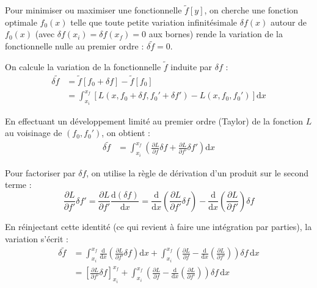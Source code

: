 \documentclass[french]{yLectureNote}
\newcommand{\dd}{\mathrm{d}}
\begin{document}

Pour minimiser ou maximiser une fonctionnelle $\tilde{f}[y]$, on cherche une fonction optimale $f_0(x)$ telle que toute petite variation infinitésimale $\delta f(x)$ autour de $f_0(x)$ (avec $\delta f(x_i) = \delta f(x_f) = 0$ aux bornes) rende la variation de la fonctionnelle nulle au premier ordre : $\delta \tilde{f} = 0$.

On calcule la variation de la fonctionnelle $\tilde{f}$ induite par $\delta f$ :
\begin{align*}
    \delta \tilde{f} &= \tilde{f}[f_0 + \delta f] - \tilde{f}[f_0] \\
    &= \int_{x_i}^{x_f} \left[ L(x, f_0 + \delta f, f_0' + \delta f') - L(x, f_0, f_0') \right] \dd x 
\end{align*}

En effectuant un développement limité au premier ordre (Taylor) de la fonction $L$ au voisinage de $(f_0, f_0')$, on obtient :
\begin{align*}
    \delta \tilde{f} &= \int_{x_i}^{x_f} \left( \frac{\partial L}{\partial f} \delta f + \frac{\partial L}{\partial f'} \delta f' \right) \dd x 
\end{align*}

Pour factoriser par $\delta f$, on utilise la règle de dérivation d'un produit sur le second terme : 
$$\frac{\partial L}{\partial f'} \delta f' = \frac{\partial L}{\partial f'} \frac{\dd (\delta f)}{\dd x} = \frac{\dd}{\dd x} \left( \frac{\partial L}{\partial f'} \delta f \right) - \frac{\dd}{\dd x} \left( \frac{\partial L}{\partial f'} \right) \delta f$$

En réinjectant cette identité (ce qui revient à faire une intégration par parties), la variation s'écrit :
\begin{align*}
    \delta \tilde{f} &= \int_{x_i}^{x_f} \frac{\dd}{\dd x} \left( \frac{\partial L}{\partial f'} \delta f \right) \dd x + \int_{x_i}^{x_f} \left( \frac{\partial L}{\partial f} - \frac{\dd}{\dd x} \left( \frac{\partial L}{\partial f'} \right) \right) \delta f \, \dd x \\
    &= \left[ \frac{\partial L}{\partial f'} \delta f \right]_{x_i}^{x_f} + \int_{x_i}^{x_f} \left( \frac{\partial L}{\partial f} - \frac{\dd}{\dd x} \left( \frac{\partial L}{\partial f'} \right) \right) \delta f \, \dd x
\end{align*}
\end{document}
